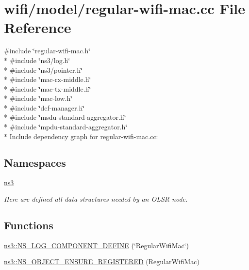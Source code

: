 \hypertarget{regular-wifi-mac_8cc}{}\section{wifi/model/regular-\/wifi-\/mac.cc File Reference}
\label{regular-wifi-mac_8cc}
{\ttfamily \#include \char`\"{}regular-\/wifi-\/mac.\+h\char`\"{}}\\*
{\ttfamily \#include \char`\"{}ns3/log.\+h\char`\"{}}\\*
{\ttfamily \#include \char`\"{}ns3/pointer.\+h\char`\"{}}\\*
{\ttfamily \#include \char`\"{}mac-\/rx-\/middle.\+h\char`\"{}}\\*
{\ttfamily \#include \char`\"{}mac-\/tx-\/middle.\+h\char`\"{}}\\*
{\ttfamily \#include \char`\"{}mac-\/low.\+h\char`\"{}}\\*
{\ttfamily \#include \char`\"{}dcf-\/manager.\+h\char`\"{}}\\*
{\ttfamily \#include \char`\"{}msdu-\/standard-\/aggregator.\+h\char`\"{}}\\*
{\ttfamily \#include \char`\"{}mpdu-\/standard-\/aggregator.\+h\char`\"{}}\\*
Include dependency graph for regular-\/wifi-\/mac.cc\+:
\subsection*{Namespaces}
\begin{DoxyCompactItemize}
\item 
 \hyperlink{namespacens3}{ns3}
\begin{DoxyCompactList}\small\item\em Here are defined all data structures needed by an O\+L\+SR node. \end{DoxyCompactList}\end{DoxyCompactItemize}
\subsection*{Functions}
\begin{DoxyCompactItemize}
\item 
\hyperlink{namespacens3_a7f89eaa376138ff8f6c27343a288e476}{ns3\+::\+N\+S\+\_\+\+L\+O\+G\+\_\+\+C\+O\+M\+P\+O\+N\+E\+N\+T\+\_\+\+D\+E\+F\+I\+NE} (\char`\"{}Regular\+Wifi\+Mac\char`\"{})
\item 
\hyperlink{namespacens3_a24de2cff1e48e6364966a684a6b22e6f}{ns3\+::\+N\+S\+\_\+\+O\+B\+J\+E\+C\+T\+\_\+\+E\+N\+S\+U\+R\+E\+\_\+\+R\+E\+G\+I\+S\+T\+E\+R\+ED} (Regular\+Wifi\+Mac)
\end{DoxyCompactItemize}
